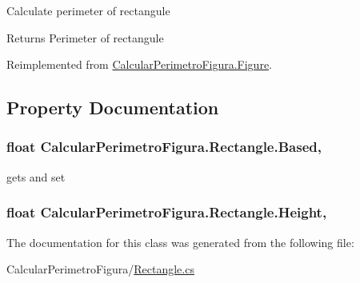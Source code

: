 Calculate perimeter of rectangule 

\begin{DoxyReturn}{Returns}
Perimeter of rectangule
\end{DoxyReturn}


Reimplemented from \hyperlink{class_calcular_perimetro_figura_1_1_figure_a26c46475b59d2855438e752aad406c6a}{Calcular\+Perimetro\+Figura.\+Figure}.



\subsection{Property Documentation}
\hypertarget{class_calcular_perimetro_figura_1_1_rectangle_a7818a1ccf4e1f12c683b7ea6f8834567}{}
\subsubsection[{Based}]{\setlength{\rightskip}{0pt plus 5cm}float Calcular\+Perimetro\+Figura.\+Rectangle.\+Based\hspace{0.3cm}{\ttfamily [get]}, {\ttfamily [set]}}\label{class_calcular_perimetro_figura_1_1_rectangle_a7818a1ccf4e1f12c683b7ea6f8834567}


gets and set 

\hypertarget{class_calcular_perimetro_figura_1_1_rectangle_a16c89c3d3d96d2a3902cedda9533ff83}{}
\subsubsection[{Height}]{\setlength{\rightskip}{0pt plus 5cm}float Calcular\+Perimetro\+Figura.\+Rectangle.\+Height\hspace{0.3cm}{\ttfamily [get]}, {\ttfamily [set]}}\label{class_calcular_perimetro_figura_1_1_rectangle_a16c89c3d3d96d2a3902cedda9533ff83}






The documentation for this class was generated from the following file\+:\begin{DoxyCompactItemize}
\item 
Calcular\+Perimetro\+Figura/\hyperlink{_rectangle_8cs}{Rectangle.\+cs}\end{DoxyCompactItemize}

